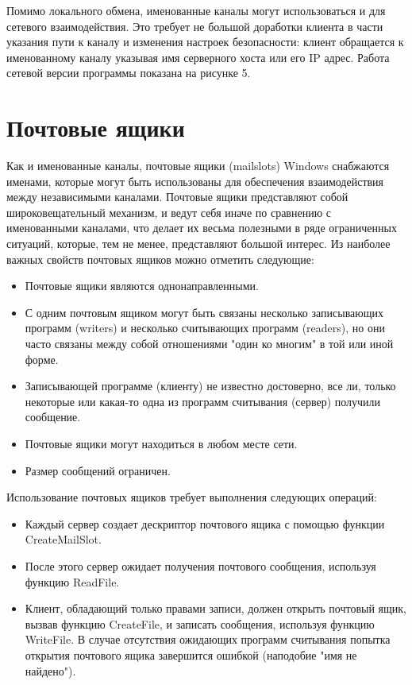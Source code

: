 \documentclass[a4paper, 12pt]{report}		%
\begin{document}
Помимо локального обмена, именованные каналы могут использоваться и для сетевого взаимодействия. Это требует не большой доработки клиента в части указания пути к каналу и изменения настроек безопасности: клиент обращается к именованному каналу указывая имя серверного хоста или его IP адрес. Работа сетевой версии программы показана на рисунке 5. 

\chapter*{Почтовые ящики}

Как и именованные каналы, почтовые ящики (mailslots) Windows снабжаются именами, которые могут быть использованы для обеспечения взаимодействия между независимыми каналами. Почтовые ящики представляют собой широковещательный механизм, и ведут себя иначе по сравнению с именованными каналами, что делает их весьма полезными в ряде ограниченных ситуаций, которые, тем не менее, представляют большой интерес. Из наиболее важных свойств почтовых ящиков можно отметить следующие:

\begin{itemize}
\item Почтовые ящики являются однонаправленными.

\item С одним почтовым ящиком могут быть связаны несколько записывающих программ (writers) и несколько считывающих программ (readers), но они часто связаны между собой отношениями "один ко многим" в той или иной форме.

\item Записывающей программе (клиенту) не известно достоверно, все ли, только некоторые или какая-то одна из программ считывания (сервер) получили сообщение.

\item Почтовые ящики могут находиться в любом месте сети.

\item Размер сообщений ограничен.
\end{itemize}

Использование почтовых ящиков требует выполнения следующих операций:
\begin{itemize}
\item Каждый сервер создает дескриптор почтового ящика с помощью функции CreateMailSlot.

\item После этого сервер ожидает получения почтового сообщения, используя функцию ReadFile.

\item Клиент, обладающий только правами записи, должен открыть почтовый ящик, вызвав функцию CreateFile, и записать сообщения, используя функцию WriteFile. В случае отсутствия ожидающих программ считывания попытка открытия почтового ящика завершится ошибкой (наподобие "имя не найдено").
\end{itemize}
\end{document}
